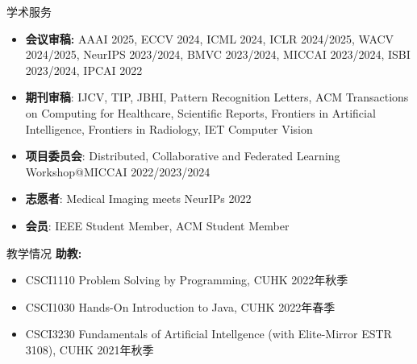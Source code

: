 \documentclass[a4paper]{resume} %
\begin{document}
\begin{rSection}{学术服务}
\begin{itemize}
\item {\bf 会议审稿:} AAAI 2025, ECCV 2024, ICML 2024, ICLR 2024/2025, WACV 2024/2025, NeurIPS 2023/2024, BMVC 2023/2024, MICCAI 2023/2024, ISBI 2023/2024, IPCAI 2022

\item {\bf 期刊审稿}: IJCV, TIP, JBHI, Pattern Recognition Letters, ACM Transactions on Computing for Healthcare, Scientific Reports, Frontiers in Artificial Intelligence, Frontiers in Radiology, IET Computer Vision

\item {\bf 项目委员会}: Distributed, Collaborative and Federated Learning Workshop@MICCAI 2022/2023/2024

\item {\bf 志愿者}: Medical Imaging meets NeurIPs 2022

\item {\bf 会员}: IEEE Student Member, ACM Student Member

\end{itemize}
\end{rSection}


\begin{rSection}{教学情况} 
{\bf 助教:}
\vspace{-0.2em}
\begin{itemize}
	\item CSCI1110 Problem Solving by Programming, CUHK \hfill{2022年秋季}
	\item CSCI1030 Hands-On Introduction to Java, CUHK \hfill{2022年春季}
	\item CSCI3230 Fundamentals of Artificial Intellgence (with Elite-Mirror ESTR 3108), CUHK \hfill{2021年秋季}
\end{itemize}
\end{rSection}





\end{document}
